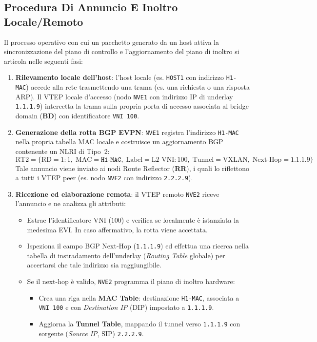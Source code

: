 \documentclass[11pt, a4paper]{article}
\begin{document}
\subsection{Procedura Di Annuncio E Inoltro Locale/Remoto}

Il processo operativo con cui un pacchetto generato da un host attiva la sincronizzazione del piano di controllo e l'aggiornamento del piano di inoltro si articola nelle seguenti fasi:


\begin{enumerate}
    \item \textbf{Rilevamento locale dell'host}: l'host locale (es. \texttt{HOST1} con indirizzo \texttt{H1-MAC}) accede alla rete trasmettendo una trama (es. una richiesta o una risposta ARP). Il VTEP locale d'accesso (nodo \texttt{NVE1} con indirizzo IP di underlay \texttt{1.1.1.9}) intercetta la trama sulla propria porta di accesso associata al bridge domain (\textbf{BD}) con identificatore \texttt{VNI 100}.
    \item \textbf{Generazione della rotta BGP EVPN}: \texttt{NVE1} registra l'indirizzo \texttt{H1-MAC} nella propria tabella MAC locale e costruisce un aggiornamento BGP contenente un NLRI di Tipo~2:
    \[
    \text{RT2} = \Big\{ \text{RD}=1:1, \; \text{MAC}=\texttt{H1-MAC}, \; \text{Label}=\text{L2 VNI}:100, \; \text{Tunnel}=\text{VXLAN}, \; \text{Next-Hop}=1.1.1.9 \Big\}
    \]
    Tale annuncio viene inviato ai nodi Route Reflector (\textbf{RR}), i quali lo riflettono a tutti i VTEP peer (es. nodo \texttt{NVE2} con indirizzo \texttt{2.2.2.9}).
    \item \textbf{Ricezione ed elaborazione remota}: il VTEP remoto \texttt{NVE2} riceve l'annuncio e ne analizza gli attributi:
    \begin{itemize}[noitemsep]
        \item Estrae l'identificatore VNI ($100$) e verifica se localmente è istanziata la medesima EVI. In caso affermativo, la rotta viene accettata.
        \item Ispeziona il campo BGP Next-Hop (\texttt{1.1.1.9}) ed effettua una ricerca nella tabella di instradamento dell'underlay (\emph{Routing Table} globale) per accertarsi che tale indirizzo sia raggiungibile.
        \item Se il next-hop è valido, \texttt{NVE2} programma il piano di inoltro hardware:
        \begin{itemize}
            \item Crea una riga nella \textbf{MAC Table}: destinazione \texttt{H1-MAC}, associata a \texttt{VNI 100} e con \emph{Destination IP} (DIP) impostato a \texttt{1.1.1.9}.
            \item Aggiorna la \textbf{Tunnel Table}, mappando il tunnel verso \texttt{1.1.1.9} con sorgente (\emph{Source IP}, SIP) \texttt{2.2.2.9}.
        \end{itemize}
    \end{itemize}
\end{enumerate}
\end{document}
